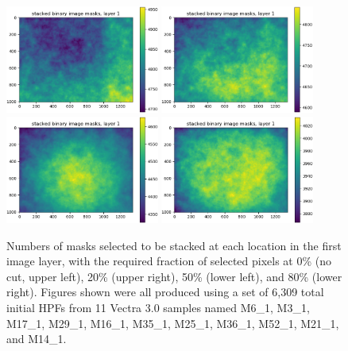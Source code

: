 \documentclass[letterpaper,11pt]{article}
\begin{document}
\begin{figure}[!ht]
\centering
\includegraphics[width=0.45\textwidth]{images/measuring_flatfield_corrections/example_mask_stack_layer_1_cut_at_0_00}
\includegraphics[width=0.45\textwidth]{images/measuring_flatfield_corrections/example_mask_stack_layer_1_cut_at_0_20}
\includegraphics[width=0.45\textwidth]{images/measuring_flatfield_corrections/example_mask_stack_layer_1_cut_at_0_50}
\includegraphics[width=0.45\textwidth]{images/measuring_flatfield_corrections/example_mask_stack_layer_1_cut_at_0_80}
\caption{\footnotesize Numbers of masks selected to be stacked at each location in the first image layer, with the required fraction of selected pixels at 0\% (no cut, upper left), 20\% (upper right), 50\% (lower left), and 80\% (lower right). Figures shown were all produced using a set of 6,309 total initial HPFs from 11 Vectra 3.0 samples named M6\_1, M3\_1, M17\_1, M29\_1, M16\_1, M35\_1, M25\_1, M36\_1, M52\_1, M21\_1, and M14\_1.}
\label{fig:selected_pixel_fraction_cut_1}
\end{figure}
\end{document}

